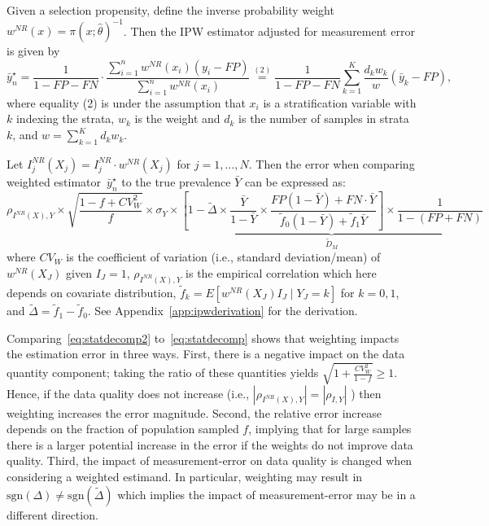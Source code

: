 \documentclass[11pt]{amsart}
\numberwithin{equation}{section}
\theoremstyle{plain}
\begin{document}
 Given a selection propensity, define the inverse probability weight~$w^{NR}(x) = \pi (x; \hat \theta)^{-1}$. Then the IPW estimator adjusted for measurement error is given by
 \begin{equation}
 \label{eq:ipwest}
 \bar y_n^\star
 = \frac{1}{1-FP-FN} \cdot \frac{\sum_{i=1}^n w^{NR} (x_i) (y_i - FP)}{\sum_{i=1}^n w^{NR} (x_i)}
 \stackrel{(2)}{=} \frac{1}{1-FP-FN} \sum_{k=1}^K \frac{d_k w_k}{w} (\bar y_k - FP),
 \end{equation}
 where equality (2) is under the assumption that $x_i$ is a stratification variable with $k$ indexing the strata, $w_k$ is the weight and $d_k$ is the number of samples in strata $k$, and $w = \sum_{k=1}^K d_k w_k$.

 Let $I_j^{NR} (X_j) = I_j^{NR}  \cdot w^{NR}(X_j)$ for $j=1,\ldots,N$.  Then the error when comparing weighted estimator~$\bar y_n^\star$ to the true prevalence $\bar Y$ can be expressed as:
 \begin{equation}
 \label{eq:statdecomp2}
 \rho_{I^{NR} (X), Y} \times \sqrt{\frac{1-f+ CV^2_W}{f}} \times \sigma_{Y} \times \underbrace{\left[ 1 - \tilde \Delta \times \frac{\bar Y}{1-\bar Y} \times \frac{FP(1-\bar Y) + FN \cdot \bar Y}{\tilde f_0 (1-\bar Y) + \tilde f_1 \bar Y} \right] \times \frac{1}{1-(FP+FN)}}_{\tilde D_M}
 \end{equation}
 where $CV_W$ is the coefficient of variation (i.e., standard deviation/mean) of $w^{NR} (X_J)$ given $I_J = 1$, $\rho_{I^{NR} (X), Y}$ is the empirical correlation which here depends on covariate distribution, $\tilde f_k = E[ w^{NR} (X_J) I_J \mid Y_J = k]$ for $k=0,1$, and $\tilde \Delta = \tilde f_1 - \tilde f_0$.  See Appendix~\ref{app:ipwderivation} for the derivation.

 Comparing~\eqref{eq:statdecomp2} to~\eqref{eq:statdecomp} shows that weighting impacts the estimation error in three ways.  First, there is a negative impact on the data quantity component; taking the ratio of these quantities yields
 $\sqrt{1 + \frac{CV_W^2}{1-f}} \geq 1$.  Hence, if the data quality does not increase (i.e., $| \rho_{I^{NR} (X), Y} | = | \rho_{I,Y}|$ ) then weighting increases the error magnitude.  Second, the relative error increase depends on the fraction of population sampled $f$, implying that for large samples there is a larger potential increase in the error if the weights do not improve data quality. Third, the impact of measurement-error on data quality is changed when considering a weighted estimand. In particular, weighting may result in $\text{sgn}(\Delta) \neq \text{sgn} (\tilde \Delta)$ which implies the impact of measurement-error may be in a different direction.
\end{document}
